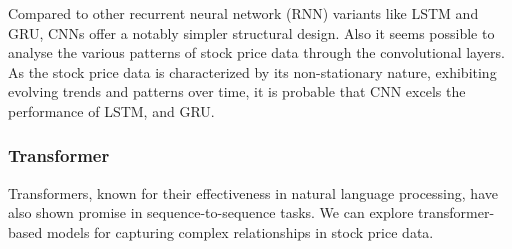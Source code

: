 Compared to other recurrent neural network (RNN) variants like LSTM and GRU, CNNs offer a notably simpler structural design. 
Also it seems possible to analyse the various patterns of stock price data through the convolutional layers.
As the stock price data is characterized by its non-stationary nature, exhibiting evolving trends and patterns over time, 
it is probable that CNN excels the performance of LSTM, and GRU.

\subsubsection{Transformer}

Transformers, known for their effectiveness in natural language processing, have also shown promise in sequence-to-sequence tasks. 
We can explore transformer-based models for capturing complex relationships in stock price data.

